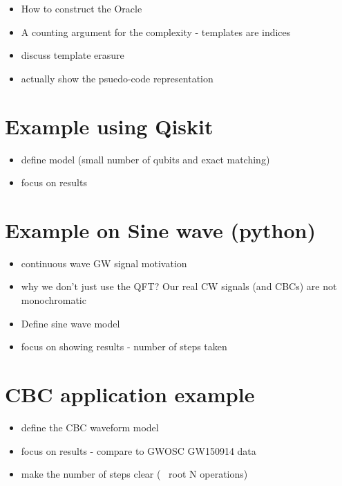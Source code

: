 \documentclass[aps,prd,nofootinbib,twocolumn,reprint,superscriptaddress,showpacs,showkeys,longbibliography]{revtex4-1}
\begin{document}
\begin{itemize}
\item How to construct the Oracle
\item A counting argument for the complexity - templates are indices
\item discuss template erasure
\item actually show the psuedo-code representation
\end{itemize}

\section{Example using Qiskit}\label{sec:qizkitexample}

\begin{itemize}
\item define model (small number of qubits and exact matching)
\item focus on results
\end{itemize}

\section{Example on Sine wave (python)}\label{sec:sineexample}

\begin{itemize}
\item continuous wave GW signal motivation
\item why we don't just use the QFT? Our real CW signals (and CBCs) are not monochromatic
\item Define sine wave model
\item focus on showing results - number of steps taken
\end{itemize}

\section{CBC application example}\label{sec:cbcexample}

\begin{itemize}
\item define the CBC waveform model
\item focus on results - compare to GWOSC GW150914 data
\item make the number of steps clear (~ root N operations)
\end{itemize}
\end{document}
